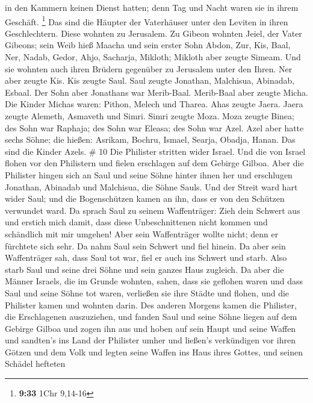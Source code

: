in den Kammern keinen Dienst hatten; denn Tag und Nacht waren sie in
ihrem Geschäft. \footnote{\textbf{9:33} 1Chr 9,14-16}  Das
sind die Häupter der Vaterhäuser unter den Leviten in ihren
Geschlechtern. Diese wohnten zu Jerusalem.  Zu Gibeon
wohnten Jeiel, der Vater Gibeons; sein Weib hieß Maacha 
und sein erster Sohn Abdon, Zur, Kis, Baal, Ner, Nadab, 
Gedor, Ahjo, Sacharja, Mikloth;  Mikloth aber zeugte
Simeam. Und sie wohnten auch ihren Brüdern gegenüber zu Jerusalem unter
den Ihren.  Ner aber zeugte Kis. Kis zeugte Saul. Saul
zeugte Jonathan, Malchisua, Abinadab, Esbaal.  Der Sohn
aber Jonathans war Merib-Baal. Merib-Baal aber zeugte Micha.
 Die Kinder Michas waren: Pithon, Melech und Tharea.
 Ahas zeugte Jaera. Jaera zeugte Alemeth, Asmaveth und
Simri. Simri zeugte Moza.  Moza zeugte Binea; des Sohn war
Raphaja; des Sohn war Eleasa; des Sohn war Azel.  Azel aber
hatte sechs Söhne; die hießen: Asrikam, Bochru, Ismael, Searja, Obadja,
Hanan. Das sind die Kinder Azels. \# 10  Die Philister
stritten wider Israel. Und die von Israel flohen vor den Philistern und
fielen erschlagen auf dem Gebirge Gilboa.  Aber die
Philister hingen sich an Saul und seine Söhne hinter ihnen her und
erschlugen Jonathan, Abinadab und Malchisua, die Söhne Sauls.
 Und der Streit ward hart wider Saul; und die Bogenschützen
kamen an ihn, dass er von den Schützen verwundet ward.  Da
sprach Saul zu seinem Waffenträger: Zieh dein Schwert aus und erstich
mich damit, dass diese Unbeschnittenen nicht kommen und schändlich mit
mir umgehen! Aber sein Waffenträger wollte nicht; denn er fürchtete sich
sehr. Da nahm Saul sein Schwert und fiel hinein.  Da aber
sein Waffenträger sah, dass Saul tot war, fiel er auch ins Schwert und
starb.  Also starb Saul und seine drei Söhne und sein ganzes
Haus zugleich.  Da aber die Männer Israels, die im Grunde
wohnten, sahen, dass sie geflohen waren und dass Saul und seine Söhne
tot waren, verließen sie ihre Städte und flohen, und die Philister kamen
und wohnten darin.  Des anderen Morgens kamen die Philister,
die Erschlagenen auszuziehen, und fanden Saul und seine Söhne liegen auf
dem Gebirge Gilboa  und zogen ihn aus und hoben auf sein
Haupt und seine Waffen und sandten's ins Land der Philister umher und
ließen's verkündigen vor ihren Götzen und dem Volk  und
legten seine Waffen ins Haus ihres Gottes, und seinen Schädel hefteten
